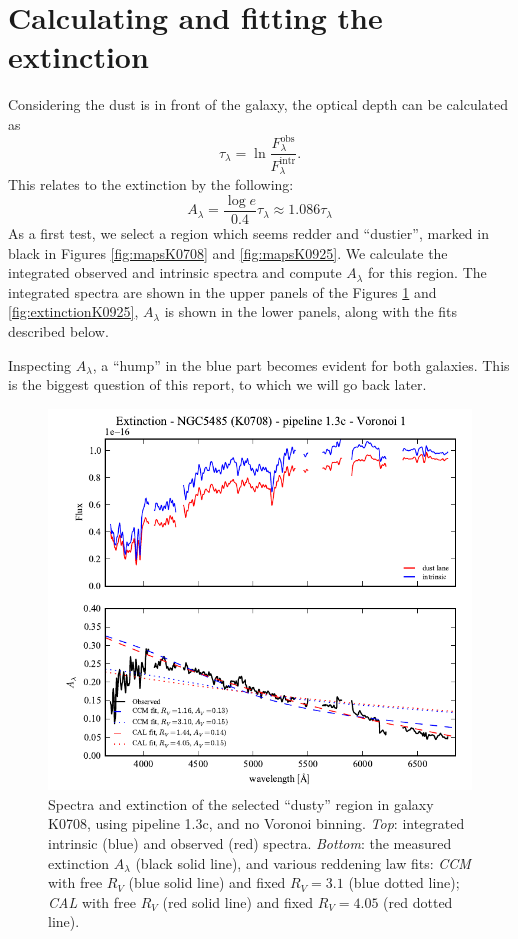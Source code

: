 \documentclass[a4paper]{article}
\def\CCM{\textit{CCM}\xspace}
\def\CAL{\textit{CAL}\xspace}
\begin{document}
\section{Calculating and fitting the extinction}

Considering the dust is in front of the galaxy, the optical depth can be
calculated as
\begin{equation}
\tau_\lambda = \ln \frac{F^\text{obs}_\lambda}{F^\text{intr}_\lambda}.
\end{equation}
This relates to the extinction by the following:
\begin{equation}
A_\lambda = \frac{\log e}{0.4} \tau_\lambda \approx 1.086 \tau_\lambda
\end{equation}
As a first test, we select a region which seems redder and ``dustier'', marked in
black in Figures \ref{fig:mapsK0708} and \ref {fig:mapsK0925}. We calculate the
integrated observed and intrinsic spectra and compute $A_\lambda$ for this
region. The integrated spectra are shown in the upper panels of the Figures
\ref{fig:extinctionK0708} and \ref{fig:extinctionK0925}, $A_\lambda$ is shown
in the lower panels, along with the fits described below.

Inspecting $A_\lambda$, a ``hump'' in the blue part becomes evident for both
galaxies. This is the biggest question of this report, to which we will go back
later.

\begin{figure}
\includegraphics{figures/spectra_K0708_1.3c_v01.pdf}

\caption{Spectra and extinction of the selected ``dusty'' region in galaxy
K0708, using pipeline 1.3c, and no Voronoi binning. {\em Top}: integrated
intrinsic (blue) and observed (red) spectra.
{\em Bottom}: the measured extinction $A_\lambda$ (black solid line), and
various reddening law fits: \CCM with free $R_V$ (blue solid line) and fixed
$R_V = 3.1$ (blue dotted line); \CAL with free $R_V$ (red solid line) and fixed
$R_V = 4.05$ (red dotted line).}
\label{fig:extinctionK0708}
\end{figure}
\end{document}
